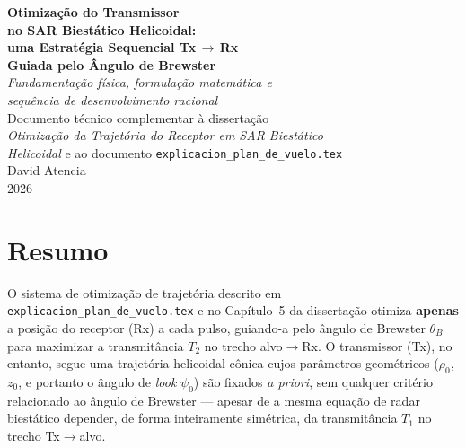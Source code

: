 \documentclass[12pt,a4paper,oneside]{book}
\theoremstyle{definition}
\theoremstyle{remark}
\newcommand{\thetaB}{\theta_B}
\begin{document}
\frontmatter

\begin{titlepage}
\centering
\vspace*{2cm}
{\LARGE\bfseries Otimização do Transmissor\\
no SAR Biestático Helicoidal:\\
uma Estratégia Sequencial Tx$\,\to\,$Rx\\
Guiada pelo Ângulo de Brewster}\\[1.2cm]
{\large\itshape Fundamentação física, formulação matemática e\\
sequência de desenvolvimento racional}\\[2cm]
{\normalsize Documento técnico complementar à dissertação\\
\textit{Otimização da Trajetória do Receptor em SAR Biestático\\
Helicoidal} e ao documento \texttt{explicacion\_plan\_de\_vuelo.tex}}\\[2cm]
{\normalsize David Atencia}\\[0.4cm]
{\normalsize 2026}
\vfill
\end{titlepage}

\chapter*{Resumo}

O sistema de otimização de trajetória descrito em \texttt{explicacion\_plan\_de\_vuelo.tex}
e no Capítulo~5 da dissertação otimiza \textbf{apenas} a posição do receptor (Rx) a
cada pulso, guiando-a pelo ângulo de Brewster $\thetaB$ para maximizar a
transmitância $T_2$ no trecho alvo$\to$Rx. O transmissor (Tx), no entanto, segue
uma trajetória helicoidal cônica cujos parâmetros geométricos
($\rho_0$, $z_0$, e portanto o ângulo de \textit{look} $\psi_0$) são fixados
\emph{a priori}, sem qualquer critério relacionado ao ângulo de Brewster — apesar
de a mesma equação de radar biestático depender, de forma inteiramente simétrica,
da transmitância $T_1$ no trecho Tx$\to$alvo.
\end{document}

